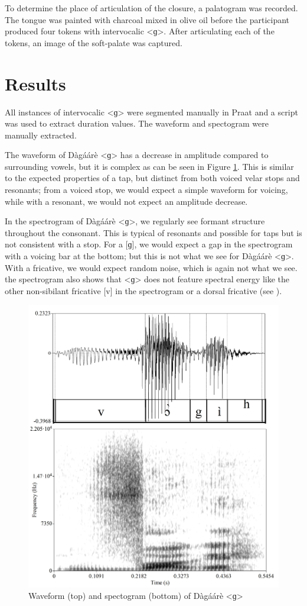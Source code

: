 \documentclass[output=paper, modfonts]{langscibook}
\begin{document}
\begin{sloppypar}
To determine the place of articulation of the closure, a palatogram was recorded. The tongue was painted with charcoal mixed in olive oil before the participant produced four tokens with intervocalic <ɡ>. After articulating each of the tokens, an image of the soft-palate was captured.
\end{sloppypar}

\section{Results}
All instances of intervocalic <ɡ> were segmented manually in Praat \citep{boersma2002praat} and a script was used to extract duration values. The waveform and spectogram were manually extracted.

The waveform of Dàgáárè <ɡ> has a decrease in amplitude compared to surrounding vowels, but it is complex as can be seen in Figure \ref{tab:1:spectogram}. This is similar to the expected properties of a tap, but distinct from both voiced velar stops and resonants; from a voiced stop, we would expect a simple waveform for voicing, while with a resonant, we would not expect an amplitude decrease.

\begin{sloppypar}
In the spectrogram of Dàgáárè <ɡ>, we regularly see formant structure throughout the consonant. This is typical of resonants and possible for taps but is not consistent with a stop. For a [ɡ], we would expect a gap in the spectrogram with a voicing bar at the bottom; but this is not what we see for Dàgáárè <ɡ>. With a fricative, we would expect random noise, which is again not what we see. the spectrogram also shows that <ɡ> does not feature spectral energy like the other non-sibilant fricative [v] in the spectrogram or a dorsal fricative (see \citealt{jesus2005acoustic}).
\end{sloppypar}

\begin{figure}[H]
\includegraphics[width=0.75\linewidth]{wave_specto_vogi2.jpg}
  \caption{Waveform (top) and spectogram (bottom) of Dàgáárè <ɡ>}
  \label{tab:1:spectogram}
\end{figure}
\end{document}
